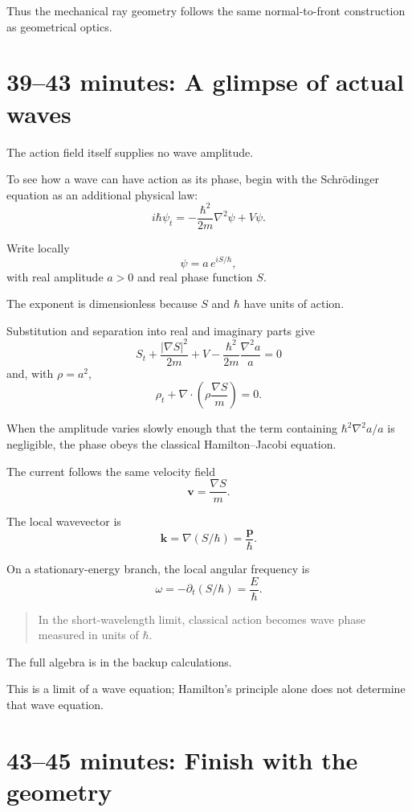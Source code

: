 \documentclass[11pt,a4paper]{article}
\newcommand{\vp}{\mathbf{p}}
\newcommand{\vv}{\mathbf{v}}
\begin{document}
Thus the mechanical ray geometry follows the same
normal-to-front construction as geometrical optics.

\section*{39--43 minutes: A glimpse of actual waves}

The action field itself supplies no wave amplitude.

To see how a wave can have action as its phase, begin with
the Schr\"odinger equation as an additional physical law:
\[
i\hbar\psi_t
=
-\frac{\hbar^2}{2m}\nabla^2\psi+V\psi.
\]

Write locally
\[
\boxed{
\psi=a\,e^{iS/\hbar},
}
\]
with real amplitude \(a>0\) and real phase function \(S\).

The exponent is dimensionless because \(S\) and \(\hbar\)
have units of action.

Substitution and separation into real and imaginary
parts give
\[
\boxed{
S_t
+
\frac{|\nabla S|^2}{2m}
+
V
-
\frac{\hbar^2}{2m}\frac{\nabla^2a}{a}
=
0
}
\]
and, with \(\rho=a^2\),
\[
\boxed{
\rho_t
+
\nabla\cdot
\left(
\rho\frac{\nabla S}{m}
\right)
=
0.
}
\]

When the amplitude varies slowly enough that the term
containing \(\hbar^2\nabla^2a/a\) is negligible, the phase
obeys the classical Hamilton--Jacobi equation.

The current follows the same velocity field
\[
\vv=\frac{\nabla S}{m}.
\]

The local wavevector is
\[
\boxed{
\mathbf k
=
\nabla(S/\hbar)
=
\frac{\vp}{\hbar}.
}
\]

On a stationary-energy branch, the local angular
frequency is
\[
\boxed{
\omega
=
-\partial_t(S/\hbar)
=
\frac E\hbar.
}
\]

\begin{quote}
In the short-wavelength limit, classical action becomes
wave phase measured in units of \(\hbar\).
\end{quote}

The full algebra is in the backup calculations.

This is a limit of a wave equation; Hamilton's principle
alone does not determine that wave equation.

\section*{43--45 minutes: Finish with the geometry}
\end{document}
